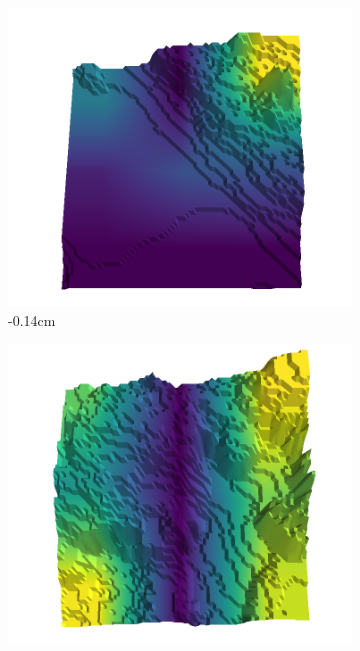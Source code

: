 \documentclass[../document.tex]{subfiles}
\begin{document}
\begin{figure}[H]
    \centering
    \begin{subfigure}[b]{0.192\linewidth}
    \includegraphics[width=\linewidth]{../img/5/quarry/false_negative/-14-patch-3d-majavi-colormap-0.png}
    \caption{-0.14cm}
    \label{fig : quarry-false_negative-1}
    \end{subfigure}
    \begin{subfigure}[b]{0.192\linewidth}
    \includegraphics[width=\linewidth]{../img/5/quarry/false_negative/-6-patch-3d-majavi-colormap-10.png}

\end{subfigure}
\end{figure}
\end{document}
